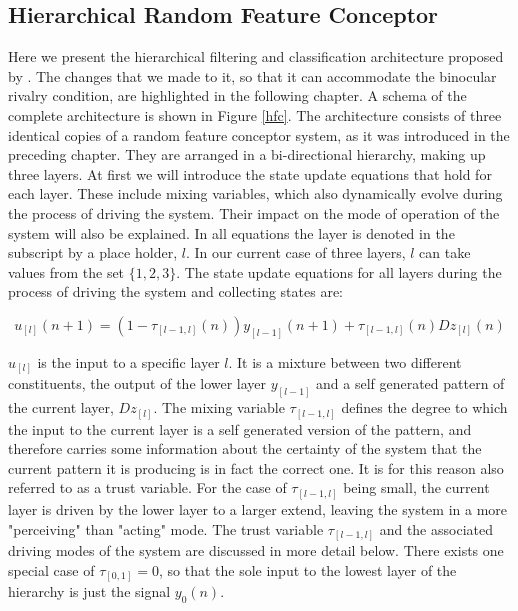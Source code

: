 \documentclass{frontiersSCNS} %
\begin{document}
\subsection{Hierarchical Random Feature Conceptor}
    Here we present the hierarchical filtering and classification architecture proposed by \cite{Jaeger2014}. The changes that we made to it, so that it can accommodate the binocular rivalry condition, are highlighted in the following chapter. A schema of the complete architecture is shown in Figure \ref{hfc}. 
    The architecture consists of three identical copies of a random feature conceptor system, as it was introduced in the preceding chapter. They are arranged in a bi-directional hierarchy, making up three layers. At first we will  introduce the state update equations that hold for each layer. These include mixing variables, which also dynamically evolve during the process of driving the system. Their impact on the mode of operation of the system will also be explained. 
    In all equations the layer is denoted in the subscript by a place holder, $l$. In our current case of three layers, $l$ can take values from the set $\{1,2,3\}$. The state update equations for all layers during the process of driving the system and collecting states are:
    
    \begin{equation}
    u_{[l]} (n + 1)  =    (1 - \tau_{[l-1,l]} (n)) y_{[l-1]} (n + 1) + \tau_{[l-1,l]} (n) D z_{[l]} (n)
    \end{equation}
    
    $u_{[l]}$ is the input to a specific layer $l$. It is a mixture between two different constituents, the output of the lower layer $y_{[l-1]}$ and a self generated pattern of the current layer,  $D z_{[l]}$. The mixing variable $\tau_{[l-1,l]}$ defines the degree to which the input to the current layer is a self generated version of the pattern, and therefore carries some information about the certainty of the system that the current pattern it is producing is in fact the correct one. It is for this reason also referred to as a trust variable. For the case of $\tau_{[l-1,l]}$ being small, the current layer is driven by the lower layer to a larger extend, leaving the system in a more "perceiving" than "acting" mode. The trust variable $\tau_{[l-1,l]}$ and the associated driving modes of the system are discussed in more detail below. 
    There exists one special case of $\tau_{[0,1]} = 0$, so that the sole input to the lowest layer of the hierarchy is just the signal $y_{0}(n)$. 
    
\end{document}
